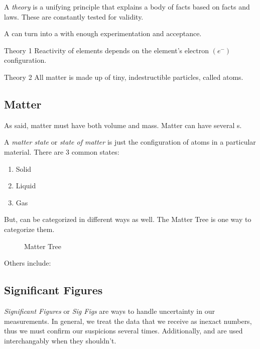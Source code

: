 \begin{definition}[Theory] \label{def:Theory}
  A \emph{theory} is a unifying principle that explains a body of facts based on facts and laws.
  These are constantly tested for validity.
  \begin{remark}
    A  can turn into a  with enough experimentation and acceptance.
  \end{remark}
\end{definition}

\begin{example}[]{Theory 1}
  Reactivity of elements depends on the element's electron $\left( e^{-} \right)$ configuration.
\end{example}

\begin{example}[]{Theory 2}
  All matter is made up of tiny, indestructible particles, called atoms.
\end{example}

\subsection{Matter} \label{subsec:Matter}
As  said, matter must have both volume and mass.
Matter can have several s.

\begin{definition} \label{def:Matter State}
  A \emph{matter state} or \emph{state of matter} is just the configuration of atoms in a particular material.
  There are 3 common states:
  \begin{enumerate}
  \item Solid
  \item Liquid
  \item Gas
  \end{enumerate}
\end{definition}

But,  can be categorized in different ways as well.
The Matter Tree is one way to categorize them.
\begin{figure}[h!]
  
  \caption{Matter Tree}
  \label{fig:Matter Tree}
\end{figure}

Others include:

\subsection{Significant Figures} \label{subsec:Sig Figs}
\begin{definition} \label{def:Sig Figs}
  \emph{Significant Figures} or \emph{Sig Figs} are ways to handle uncertainty in our measurements.
  In general, we treat the data that we receive as inexact numbers, thus we must confirm our suspicions several times.
  Additionally,  and  are used interchangably when they shouldn't.
\end{definition}

